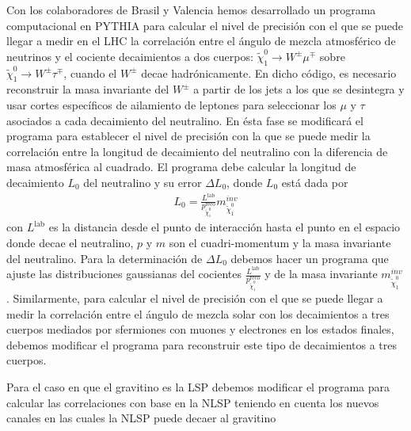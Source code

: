 \begin{itemize}
\begin{proyecto}
  Con los colaboradores de Brasil y Valencia hemos desarrollado un
  programa computacional en PYTHIA para calcular el nivel de precisión
  con el que se puede llegar a medir en el LHC la correlación entre el
  ángulo de mezcla atmosférico de neutrinos y el cociente decaimientos
  a dos cuerpos: $\tilde\chi_1^0\to W^\pm\mu^\mp$ sobre
  $\tilde\chi_1^0\to W^\pm\tau^\mp$, cuando el $W^\pm$ decae
  hadrónicamente. En dicho código, es necesario reconstruir la masa
  invariante del $W^\pm$ a partir de los jets a los que se desintegra
  y usar cortes específicos de ailamiento de leptones para seleccionar
  los $\mu$ y $\tau$ asociados a cada decaimiento del neutralino. En
  ésta fase se modificará el programa para establecer el nivel de
  precisión con la que se puede medir la correlación entre la longitud
  de decaimiento del neutralino con la diferencia de masa atmosférica
  al cuadrado.  El programa debe calcular la longitud de
  decaimiento $L_0$ del neutralino y su error $\Delta L_0$, donde
  $L_0$ está dada por
  \begin{align}
    L_0=\frac{L^{\text{lab}}}{p_{\tilde\chi_1^0}^{\text{reco}}}m_{\tilde\chi_1^0}^{inv}
  \end{align}
  con $L^{\text{lab}}$ es la distancia desde el punto de interacción
  hasta el punto en el espacio donde decae el neutralino, $p$ y $m$
  son el cuadri-momentum y la masa invariante del neutralino. Para la
  determinación de $\Delta L_0$ debemos hacer un programa que ajuste
  las distribuciones gaussianas del cocientes
  $\frac{L^{\text{lab}}}{p_{\tilde\chi_1^0}^{\text{reco}}}$ y de la
  masa invariante $m_{\tilde\chi_1^0}^{inv}$. Similarmente, para
  calcular el nivel de precisión con el que se puede llegar a medir la
  correlación entre el ángulo de mezcla solar con los decaimientos a
  tres cuerpos mediados por sfermiones con muones y electrones en los
  estados finales, debemos modificar el programa para reconstruir este
  tipo de decaimientos a tres cuerpos.
\end{proyecto}

\begin{proyecto}
  Para el caso en que el gravitino es la LSP debemos modificar el
  programa para calcular las correlaciones con base en la NLSP
  teniendo en cuenta los nuevos canales en las cuales la NLSP puede
  decaer al gravitino
\end{proyecto}



\end{itemize}
